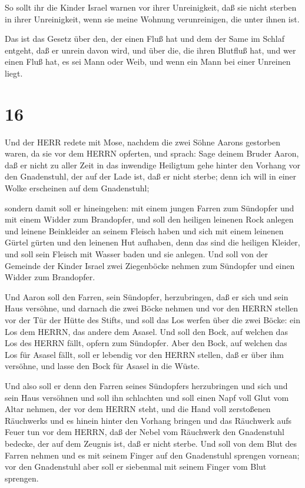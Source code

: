  So sollt ihr die Kinder Israel warnen vor ihrer
Unreinigkeit, daß sie nicht sterben in ihrer Unreinigkeit, wenn sie
meine Wohnung verunreinigen, die unter ihnen ist.

 Das ist das Gesetz über den, der einen Fluß hat und dem
der Same im Schlaf entgeht, daß er unrein davon wird,  und
über die, die ihren Blutfluß hat, und wer einen Fluß hat, es sei Mann
oder Weib, und wenn ein Mann bei einer Unreinen liegt.

\hypertarget{section-15}{%
\section{16}\label{section-15}}

 Und der HERR redete mit Mose, nachdem die zwei Söhne Aarons
gestorben waren, da sie vor dem HERRN opferten,  und sprach:
Sage deinem Bruder Aaron, daß er nicht zu aller Zeit in das inwendige
Heiligtum gehe hinter den Vorhang vor den Gnadenstuhl, der auf der Lade
ist, daß er nicht sterbe; denn ich will in einer Wolke erscheinen auf
dem Gnadenstuhl;

 sondern damit soll er hineingehen: mit einem jungen Farren
zum Sündopfer und mit einem Widder zum Brandopfer,  und soll
den heiligen leinenen Rock anlegen und leinene Beinkleider an seinem
Fleisch haben und sich mit einem leinenen Gürtel gürten und den leinenen
Hut aufhaben, denn das sind die heiligen Kleider, und soll sein Fleisch
mit Wasser baden und sie anlegen.  Und soll von der Gemeinde
der Kinder Israel zwei Ziegenböcke nehmen zum Sündopfer und einen Widder
zum Brandopfer.

 Und Aaron soll den Farren, sein Sündopfer, herzubringen,
daß er sich und sein Haus versöhne,  und darnach die zwei
Böcke nehmen und vor den HERRN stellen vor der Tür der Hütte des Stifts,
 und soll das Los werfen über die zwei Böcke: ein Los dem
HERRN, das andere dem Asasel.  Und soll den Bock, auf
welchen das Los des HERRN fällt, opfern zum Sündopfer. 
Aber den Bock, auf welchen das Los für Asasel fällt, soll er lebendig
vor den HERRN stellen, daß er über ihm versöhne, und lasse den Bock für
Asasel in die Wüste.

 Und also soll er denn den Farren seines Sündopfers
herzubringen und sich und sein Haus versöhnen und soll ihn schlachten
 und soll einen Napf voll Glut vom Altar nehmen, der vor
dem HERRN steht, und die Hand voll zerstoßenen Räuchwerks und es hinein
hinter den Vorhang bringen  und das Räuchwerk aufs Feuer
tun vor dem HERRN, daß der Nebel vom Räuchwerk den Gnadenstuhl bedecke,
der auf dem Zeugnis ist, daß er nicht sterbe.  Und soll von
dem Blut des Farren nehmen und es mit seinem Finger auf den Gnadenstuhl
sprengen vornean; vor den Gnadenstuhl aber soll er siebenmal mit seinem
Finger vom Blut sprengen.

